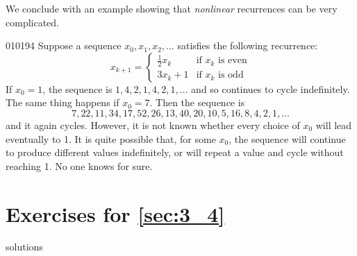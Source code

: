 We conclude with an example showing that \textit{nonlinear} recurrences can be very complicated.


\begin{example}{}{010194}
Suppose a sequence $x_{0}, x_{1}, x_{2}, \dots$  satisfies the following recurrence:
\begin{equation*}
x_{k+1} = \left\lbrace \begin{array}{ll}
\frac{1}{2} x_k & \mbox{if } x_k \mbox{ is even} \\
3x_k + 1 & \mbox{if } x_k \mbox{ is odd}
\end{array} \right.
\end{equation*}
If $x_{0} = 1$, the sequence is $1, 4, 2, 1, 4, 2, 1, \dots$  and so continues to cycle indefinitely. The same thing happens if $x_{0} = 7$. Then the sequence is
\begin{equation*}
7, 22, 11, 34, 17, 52, 26, 13, 40, 20, 10, 5, 16, 8, 4, 2, 1, \ldots
\end{equation*}
and it again cycles. However, it is not known whether every choice of $x_{0}$ will lead eventually to 1. It is quite possible that, for some $x_{0}$,
 the sequence will continue to produce different values indefinitely, or
 will repeat a value and cycle without reaching 1. No one knows for 
sure.
\end{example}

\section*{Exercises for \ref{sec:3_4}}

\begin{Filesave}{solutions}
\end{Filesave}

